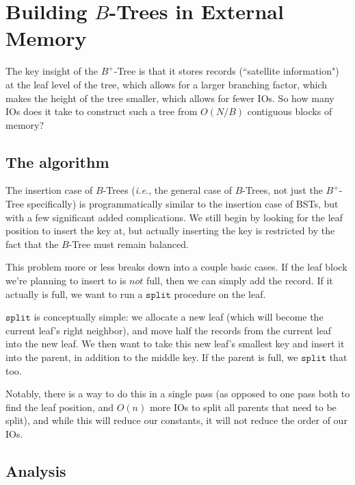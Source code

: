 \documentclass[fleqn]{article}
\begin{document}


\section{Building $B$-Trees in External Memory	}

The key insight of the $B^{+}$-Tree is that it stores records (``satellite information") at the leaf level of the tree, which allows for a larger branching factor, which makes the height of the tree smaller, which allows for fewer IOs. So how many IOs does it take to construct such a tree from $O(N/B)$ contiguous blocks of memory?

\subsection{The algorithm}

The insertion case of $B$-Trees (\textit{i.e.}, the general case of $B$-Trees, not just the $B^+$-Tree specifically) is programmatically similar to the insertion case of BSTs, but with a few significant added complications. We still begin by looking for the leaf position to insert the key at, but actually inserting the key is restricted by the fact that the $B$-Tree must remain balanced.

This problem more or less breaks down into a couple basic cases. If the leaf block we're planning to insert to is $\textit{not}$ full, then we can simply add the record. If it actually is full, we want to run a $\texttt{split}$ procedure on the leaf.

$\texttt{split}$ is conceptually simple: we allocate a new leaf (which will become the current leaf's right neighbor), and move half the records from the current leaf into the new leaf. We then want to take this new leaf's smallest key and insert it into the parent, in addition to the middle key. If the parent is full, we $\texttt{split}$ that too.

Notably, there is a way to do this in a single pass (as opposed to one pass both to find the leaf position, and $O(n)$ more IOs to split all parents that need to be split), and while this will reduce our constants, it will not reduce the order of our IOs.

\subsection{Analysis}
\end{document}
